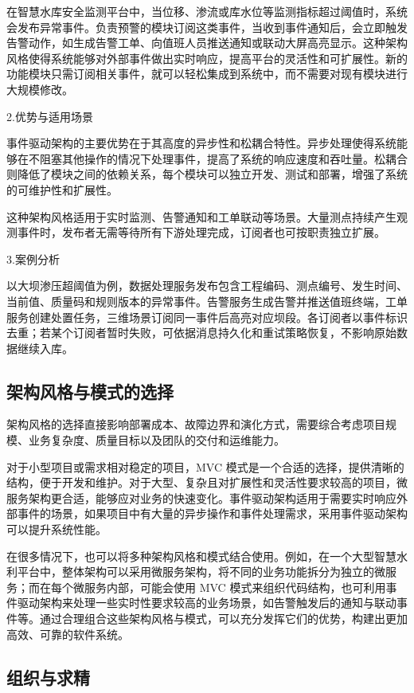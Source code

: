 在智慧水库安全监测平台中，当位移、渗流或库水位等监测指标超过阈值时，系统会发布异常事件。负责预警的模块订阅这类事件，当收到事件通知后，会立即触发告警动作，如生成告警工单、向值班人员推送通知或联动大屏高亮显示。这种架构风格使得系统能够对外部事件做出实时响应，提高平台的灵活性和可扩展性。新的功能模块只需订阅相关事件，就可以轻松集成到系统中，而不需要对现有模块进行大规模修改。

2.优势与适用场景

事件驱动架构的主要优势在于其高度的异步性和松耦合特性。异步处理使得系统能够在不阻塞其他操作的情况下处理事件，提高了系统的响应速度和吞吐量。松耦合则降低了模块之间的依赖关系，每个模块可以独立开发、测试和部署，增强了系统的可维护性和扩展性。

这种架构风格适用于实时监测、告警通知和工单联动等场景。大量测点持续产生观测事件时，发布者无需等待所有下游处理完成，订阅者也可按职责独立扩展。

3.案例分析

以大坝渗压超阈值为例，数据处理服务发布包含工程编码、测点编号、发生时间、当前值、质量码和规则版本的异常事件。告警服务生成告警并推送值班终端，工单服务创建处置任务，三维场景订阅同一事件后高亮对应坝段。各订阅者以事件标识去重；若某个订阅者暂时失败，可依据消息持久化和重试策略恢复，不影响原始数据继续入库。

\subsection{架构风格与模式的选择}

架构风格的选择直接影响部署成本、故障边界和演化方式，需要综合考虑项目规模、业务复杂度、质量目标以及团队的交付和运维能力。

对于小型项目或需求相对稳定的项目，MVC 模式是一个合适的选择，提供清晰的结构，便于开发和维护。对于大型、复杂且对扩展性和灵活性要求较高的项目，微服务架构更合适，能够应对业务的快速变化。事件驱动架构适用于需要实时响应外部事件的场景，如果项目中有大量的异步操作和事件处理需求，采用事件驱动架构可以提升系统性能。

在很多情况下，也可以将多种架构风格和模式结合使用。例如，在一个大型智慧水利平台中，整体架构可以采用微服务架构，将不同的业务功能拆分为独立的微服务；而在每个微服务内部，可能会使用 MVC 模式来组织代码结构，也可利用事件驱动架构来处理一些实时性要求较高的业务场景，如告警触发后的通知与联动事件等。通过合理组合这些架构风格与模式，可以充分发挥它们的优势，构建出更加高效、可靠的软件系统。

\subsection{组织与求精}

